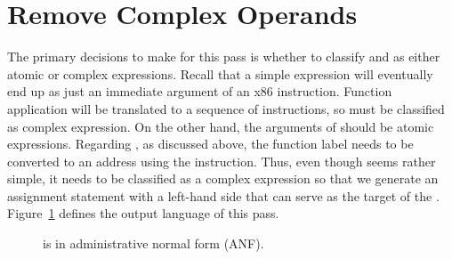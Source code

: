 \documentclass[11pt]{book}
\newcommand{\gray}[1]{{\color{gray} #1}}
\begin{document}
\section{Remove Complex Operands}
\label{sec:rco-r4}

The primary decisions to make for this pass is whether to classify
 and  as either atomic or complex
expressions. Recall that a simple expression will eventually end up as
just an immediate argument of an x86 instruction. Function
application will be translated to a sequence of instructions, so
 must be classified as complex expression.
On the other hand, the arguments of  should be
atomic expressions.
%
Regarding , as discussed above, the function label needs
to be converted to an address using the  instruction. Thus,
even though  seems rather simple, it needs to be
classified as a complex expression so that we generate an assignment
statement with a left-hand side that can serve as the target of the
. Figure~\ref{fig:Rfun-anf-syntax} defines the
output language \LangFunANF{} of this pass.

\begin{figure}[tp]
\centering
\fbox{
\begin{minipage}{0.96\textwidth}
\small
\[
\begin{array}{rcl}
  \Atm &::=& \gray{ \INT{\Int} \mid \VAR{\Var} \mid \BOOL{\itm{bool}} 
       \mid \VOID{} } \\
\Exp &::=& \gray{ \Atm \mid \READ{} } \\
   &\mid& \gray{ \NEG{\Atm} \mid \ADD{\Atm}{\Atm} } \\
   &\mid& \gray{ \LET{\Var}{\Exp}{\Exp} } \\
   &\mid& \gray{ \UNIOP{\key{'not}}{\Atm} } \\
   &\mid& \gray{ \BINOP{\itm{cmp}}{\Atm}{\Atm} \mid \IF{\Exp}{\Exp}{\Exp} }\\
   &\mid& \gray{ \LP\key{Collect}~\Int\RP \mid \LP\key{Allocate}~\Int~\Type\RP
  \mid \LP\key{GlobalValue}~\Var\RP }\\
   &\mid& \FUNREF{\Var} \mid \APPLY{\Atm}{\Atm\ldots}\\
 \Def &::=& \gray{ \FUNDEF{\Var}{([\Var \code{:} \Type]\ldots)}{\Type}{\code{'()}}{\Exp} }\\
R^{\dagger}_4  &::=& \gray{ \PROGRAMDEFS{\code{'()}}{\Def} }
\end{array}
\]
\end{minipage}
}
\caption{\LangFunANF{} is \LangFun{} in administrative normal form (ANF).}
\label{fig:Rfun-anf-syntax}
\end{figure}
\end{document}
